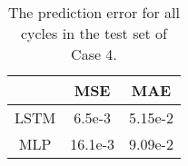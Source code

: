\begin{table}[ht!]
    \centering
    \caption{The prediction error for all cycles in the test set of Case 4.}
    \begin{tabular}{c | c c}
                    & \ac{MSE}  & \ac{MAE}  \\ \hline
        \ac{LSTM}   & 6.5e-3         & 5.15e-2         \\
        \ac{MLP}    & 16.1e-3         & 9.09e-2
    \end{tabular}
    \label{tab:case4-test-eval}
\end{table}